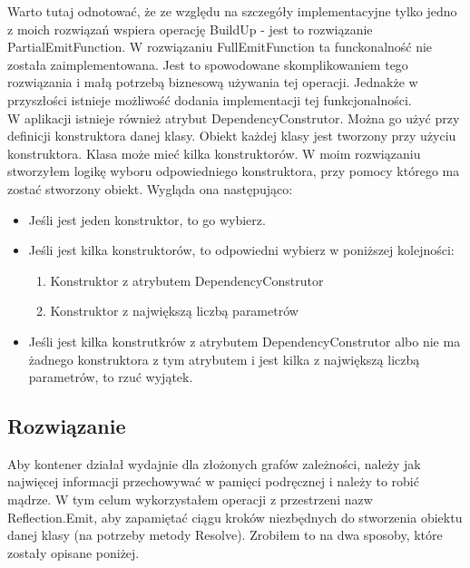 \documentclass[12pt]{article}
\begin{document}
Warto tutaj odnotować, że ze względu na szczegóły implementacyjne tylko jedno z moich rozwiązań wspiera operację BuildUp - jest to rozwiązanie PartialEmitFunction. W rozwiązaniu FullEmitFunction ta funckonalność nie została zaimplementowana. Jest to spowodowane skomplikowaniem tego rozwiązania i małą potrzebą biznesową używania tej operacji. Jednakże w przyszłości istnieje możliwość dodania implementacji tej funkcjonalności.\\

W aplikacji istnieje również atrybut DependencyConstrutor. Można go użyć przy definicji konstruktora danej klasy. Obiekt każdej klasy jest tworzony przy użyciu konstruktora. Klasa może mieć kilka konstruktorów. W moim rozwiązaniu stworzyłem logikę wyboru odpowiedniego konstruktora, przy pomocy którego ma zostać stworzony obiekt. Wygląda ona następująco:
\begin{itemize}
	\item Jeśli jest jeden konstruktor, to go wybierz.
	\item Jeśli jest kilka konstruktorów, to odpowiedni wybierz w poniższej kolejności:
	\begin{enumerate}
		\item Konstruktor z atrybutem DependencyConstrutor
		\item Konstruktor z największą liczbą parametrów
	\end{enumerate}
	\item Jeśli jest kilka konstrutkrów z atrybutem DependencyConstrutor albo nie ma żadnego konstruktora z tym atrybutem i jest kilka z największą liczbą parametrów, to rzuć wyjątek.
\end{itemize}


\subsection{Rozwiązanie}
Aby kontener działał wydajnie dla złożonych grafów zależności, należy jak najwięcej informacji przechowywać w pamięci podręcznej i należy to robić mądrze. W tym celum wykorzystałem operacji z przestrzeni nazw Reflection.Emit, aby zapamiętać ciągu kroków niezbędnych do stworzenia obiektu danej klasy (na potrzeby metody Resolve). Zrobiłem to na dwa sposoby, które zostały opisane poniżej.
\end{document}
